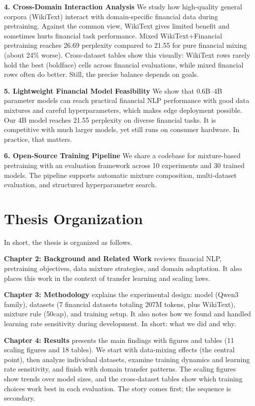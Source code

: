 \textbf{4. Cross-Domain Interaction Analysis}
We study how high-quality general corpora (WikiText) interact with domain-specific financial data during pretraining. Against the common view, WikiText gives limited benefit and sometimes hurts financial task performance. Mixed WikiText+Financial pretraining reaches 26.69 perplexity compared to 21.55 for pure financial mixing (about 24\% worse). Cross-dataset tables show this visually: WikiText rows rarely hold the best (boldface) cells across financial evaluations, while mixed financial rows often do better. Still, the precise balance depends on goals.

\textbf{5. Lightweight Financial Model Feasibility}
We show that 0.6B--4B parameter models can reach practical financial NLP performance with good data mixtures and careful hyperparameters, which makes edge deployment possible. Our 4B model reaches 21.55 perplexity on diverse financial tasks. It is competitive with much larger models, yet still runs on consumer hardware. In practice, that matters.

\textbf{6. Open-Source Training Pipeline}
We share a codebase for mixture-based pretraining with an evaluation framework across 10 experiments and 30 trained models. The pipeline supports automatic mixture composition, multi-dataset evaluation, and structured hyperparameter search.

\section{Thesis Organization}

In short, the thesis is organized as follows.

\textbf{Chapter 2: Background and Related Work} reviews financial NLP, pretraining objectives, data mixture strategies, and domain adaptation. It also places this work in the context of transfer learning and scaling laws.

\textbf{Chapter 3: Methodology} explains the experimental design: model (Qwen3 family), datasets (7 financial datasets totaling 207M tokens, plus WikiText), mixture rule (50cap), and training setup. It also notes how we found and handled learning rate sensitivity during development. In short: what we did and why.

\textbf{Chapter 4: Results} presents the main findings with figures and tables (11 scaling figures and 18 tables). We start with data-mixing effects (the central point), then analyze individual datasets, examine training dynamics and learning rate sensitivity, and finish with domain transfer patterns. The scaling figures show trends over model sizes, and the cross-dataset tables show which training choices work best in each evaluation. The story comes first; the sequence is secondary.

